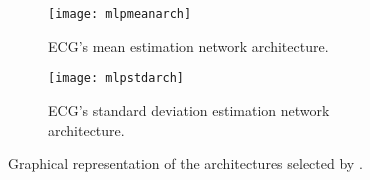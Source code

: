 \begin{figure}[htbp]
	\centering
	\begin{subfigure}{\textwidth}
		\centering
		\texttt{[image: mlpmeanarch]}
		\caption{ECG's mean estimation network
		architecture.}\label{fig:mlpmeanarch}
	\end{subfigure}
	\begin{subfigure}{\textwidth}
		\centering
		\texttt{[image: mlpstdarch]}
		\caption{ECG's standard deviation estimation network
		architecture.}\label{fig:mlpstdarch}
	\end{subfigure}
	\caption{Graphical representation of the architectures selected by
	.}\label{fig:mlparches}
\end{figure}
